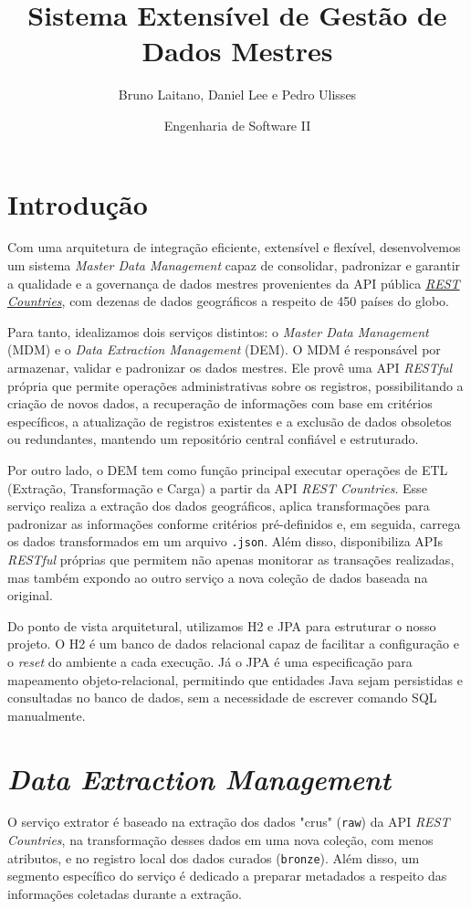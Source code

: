 \documentclass[12pt]{article}
\title{\textbf{Sistema Extensível de Gestão de Dados Mestres}}
\date{Engenharia de Software II}
\author{Bruno Laitano, Daniel Lee e Pedro Ulisses}
\begin{document}
\maketitle

\section{Introdução}
Com uma arquitetura de integração eficiente, extensível e flexível, desenvolvemos um sistema \emph{Master Data Management} capaz de consolidar, padronizar e garantir a qualidade e a governança de dados mestres provenientes da API pública \href{https://restcountries.com/v3.1/all}{\emph{REST Countries}}, com dezenas de dados geográficos a respeito de 450 países do globo.

\quad Para tanto, idealizamos dois serviços distintos: o \emph{Master Data Management} (MDM) e o \emph{Data Extraction Management} (DEM). O MDM é responsável por armazenar, validar e padronizar os dados mestres. Ele provê uma API \emph{RESTful} própria que permite operações administrativas sobre os registros, possibilitando a criação de novos dados, a recuperação de informações com base em critérios específicos, a atualização de registros existentes e a exclusão de dados obsoletos ou redundantes, mantendo um repositório central confiável e estruturado.

\quad Por outro lado, o DEM tem como função principal executar operações de ETL (Extração, Transformação e Carga) a partir da API \emph{REST Countries}. Esse serviço realiza a extração dos dados geográficos, aplica transformações para padronizar as informações conforme critérios pré-definidos e, em seguida, carrega os dados transformados em um arquivo \texttt{.json}. Além disso, disponibiliza APIs \emph{RESTful} próprias que permitem não apenas monitorar as transações realizadas, mas também expondo ao outro serviço a nova coleção de dados baseada na original.

\quad Do ponto de vista arquitetural, utilizamos H2 e JPA para estruturar o nosso projeto. O H2 é um banco de dados relacional capaz de facilitar a configuração e o \emph{reset} do ambiente a cada execução. Já o JPA é uma especificação para mapeamento objeto-relacional, permitindo que entidades Java sejam persistidas e consultadas no banco de dados, sem a necessidade de escrever comando SQL manualmente.

\section{\emph{Data Extraction Management}}
O serviço extrator é baseado na extração dos dados "crus" (\texttt{raw}) da API \emph{REST Countries}, na transformação desses dados em uma nova coleção, com menos atributos, e no registro local dos dados curados (\texttt{bronze}). Além disso, um segmento específico do serviço é dedicado a preparar metadados a respeito das informações coletadas durante a extração.
\end{document}
